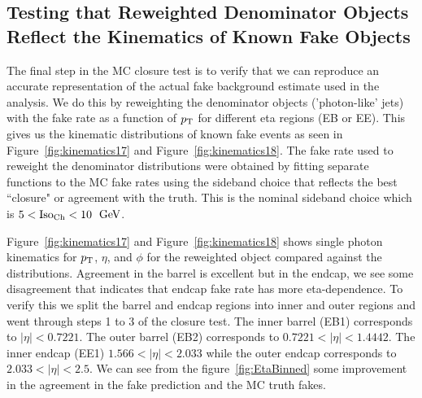\subsection{Testing that Reweighted Denominator Objects Reflect the Kinematics of Known Fake Objects}

The final step in the MC closure test is to verify that we can reproduce an accurate representation of the actual fake background estimate used in the analysis. We do this by reweighting the denominator objects ('photon-like' jets) with the fake rate as a function of $p_{\mathrm{T}}$ for different eta regions (EB or EE). This gives us the kinematic distributions of known fake events as seen in Figure~\ref{fig:kinematics17} and Figure~\ref{fig:kinematics18}. The fake rate used to reweight the denominator distributions were obtained by fitting separate functions to the MC fake rates using the sideband choice that reflects the best ``closure" or agreement with the truth. This is the nominal sideband choice which is $5 < \text{Iso}_{\text{Ch}} < 10$ $\,\text{Ge\hspace{-.08em}V}$.

Figure~\ref{fig:kinematics17} and Figure~\ref{fig:kinematics18} shows single photon kinematics for $p_{\mathrm{T}}$, $\eta$, and $\phi$ for the reweighted object compared against the distributions. Agreement in the barrel is excellent but in the endcap, we see some disagreement that indicates that endcap fake rate has more eta-dependence. To verify this we split the barrel and endcap regions into inner and outer regions and went through steps 1 to 3 of the closure test. The inner barrel (EB1) corresponds to $|\eta| <  0.7221$. The outer barrel (EB2) corresponds to $0.7221 < |\eta| < 1.4442$. The inner endcap (EE1) $1.566 < |\eta| < 2.033$ while the outer endcap corresponds to $2.033 < \lvert \eta \rvert< 2.5$. We can see from the figure~\ref{fig:EtaBinned} some improvement in the agreement in the fake prediction and the MC truth fakes.



